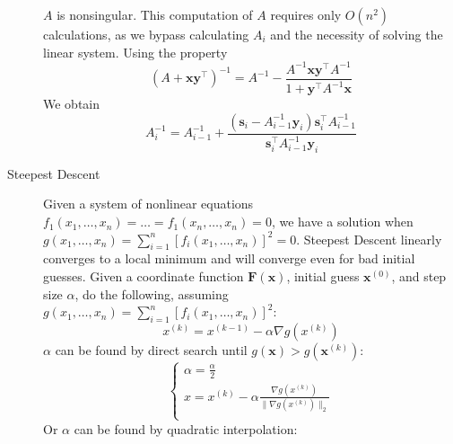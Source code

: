 \documentclass[8pt]{article}
\begin{document}
\begin{multicols}{2}
\begin{description}
      $A$ is nonsingular. This computation of $A$ requires only $O(n^2)$ calculations, as we bypass
      calculating $A_i$ and the necessity of solving the linear system. Using the property
      $$\left(A+\mathbf{x}\mathbf{y}^\top\right)^{-1} = A^{-1} - \frac{A^{-1}\mathbf{x}\mathbf{y}^\top A^{-1}}{1+\mathbf{y}^\top A^{-1}\mathbf{x}}$$
      We obtain
      $$A_i^{-1}= A_{i-1}^{-1}+\frac{(\mathbf{s}_i - A_{i-1}^{-1}\mathbf{y}_i)\mathbf{s}_i^\top A_{i-1}^{-1}}{\mathbf{s}_i^\top A_{i-1}^{-1} \mathbf{y}_i}$$
    \item[Steepest Descent] Given a system of nonlinear equations
      $f_1(x_1,\ldots,x_n)=\ldots=f_1(x_n,\ldots,x_n)=0$, we have a solution when $g(x_1,\ldots,x_n)
      = \sum_{i=1}^n[f_i(x_1,\ldots,x_n)]^2=0$. Steepest Descent linearly converges to a local
      minimum and will converge even for bad initial guesses. Given a coordinate function
      $\mathbf{F}(\mathbf{x})$, initial guess $\mathbf{x}^{(0)}$, and step size $\alpha$, do the
      following, assuming $g(x_1,\ldots,x_n) = \sum_{i=1}^n[f_i(x_1,\ldots,x_n)]^2$:
      \begin{equation*}
        x^{(k)}=x^{(k-1)}-\alpha \nabla g(x^{(k)})
      \end{equation*}
      $\alpha$ can be found by direct search until $g(\mathbf{x}) > g(\mathbf{x}^{(k)})$:
      \begin{equation*}
        \left\{
        \begin{array}{c}
          \alpha = \frac{\alpha}{2} \\
          x = x^{(k)} - \alpha \frac{\nabla g(x^{(k)})}{\|\nabla g(x^{(k)})\|_2} \\
        \end{array}
        \right.
      \end{equation*}
      Or $\alpha$ can be found by quadratic interpolation:


\end{description}
\end{multicols}
\end{document}
